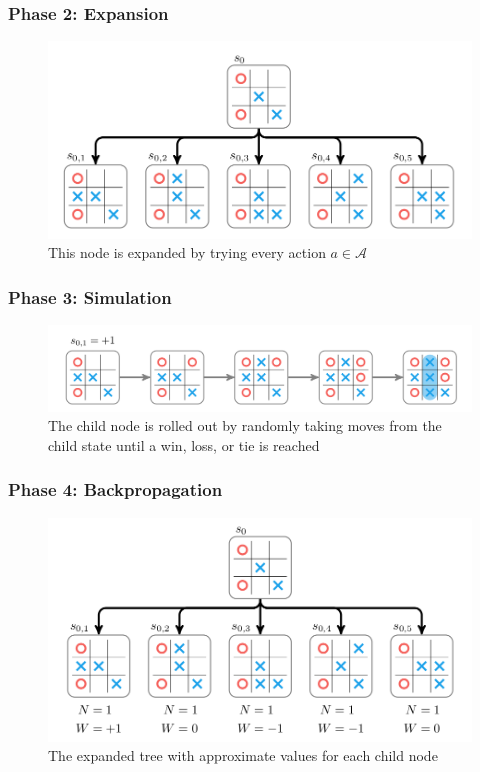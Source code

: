 \documentclass[notheorems, aspectratio=54]{beamer}
\begin{document}
\begin{frame}
    \frametitle{Phase 2: Expansion}
    \begin{figure}
        \includegraphics[width=\textwidth]{fig/mcts_expansion.png}
        \caption{This node is expanded by trying every action $a \in \mathcal{A}$}
    \end{figure}
\end{frame}

\begin{frame}
    \frametitle{Phase 3: Simulation}
    \begin{figure}
        \includegraphics[width=\textwidth]{fig/mcts_simulation.png}
        \caption{The child node is rolled out by randomly taking moves from the child state until a win, loss, or tie is reached}
    \end{figure}
\end{frame}

\begin{frame}
    \frametitle{Phase 4: Backpropagation}
    \begin{figure}
        \includegraphics[width=\textwidth]{fig/expanded_tree.png}
        \caption{The expanded tree with approximate values for each child node}
    \end{figure}
\end{frame}
\end{document}
